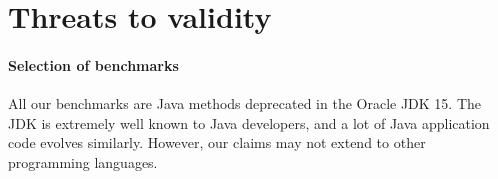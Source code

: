 \documentclass[conference]{IEEEtran}
\begin{document}






\section{Threats to validity}

\paragraph{Selection of benchmarks}
%
All our benchmarks are Java methods deprecated in the Oracle JDK 15.
The JDK is extremely well known to Java developers, and a lot
of Java application code evolves similarly.
%
However, our claims may not extend to other programming languages.

\end{document}
